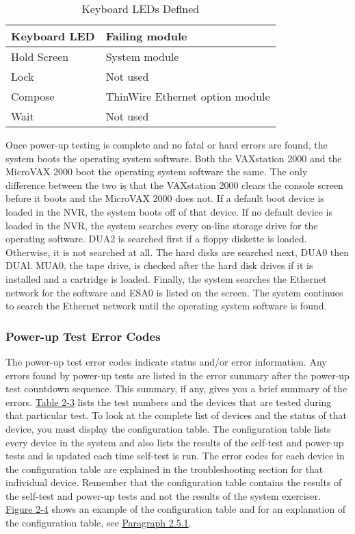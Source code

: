 \begin{table}
\label{table:2-2}
\caption{Keyboard LEDs Deflned}
\small
\begin{tabularx}{\textwidth}{l l}
\hline
\textbf{Keyboard LED} & \textbf{Failing module}\\
\hline
Hold Screen & System module \\
Lock & Not used \\
Compose & ThinWire Ethernet option module \\
Wait & Not used \\
\hline
\end{tabularx}
\end{table}

Once power-up testing is complete and no fatal or hard errors are found, the
system boots the operating system software. Both the VAXstation 2000 and
the MicroVAX 2000 boot the operating system software the same. The only
difference between the two is that the VAXstation 2000 clears the console
screen before it boots and the MicroVAX 2000 does not. If a default boot
device is loaded in the NVR, the system boots off of that device. If no
default device is loaded in the NVR, the system searches every on-line
storage drive for the operating software. DUA2 is searched first if a floppy
diskette is loaded. Otherwise, it is not searched at all. The hard disks are
searched next, DUA0 then DUAl. MUA0, the tape drive, is checked after
the hard disk drives if it is installed and a cartridge is loaded. Finally, the
system searches the Ethernet network for the software and ESA0 is listed
on the screen. The system continues to search the Ethernet network until
the operating system software is found.
\newpage
\subsubsection{Power-up Test Error Codes}

The power-up test error codes indicate status and/or error information. Any
errors found by power-up tests are listed in the error summary after the
power-up test countdown sequence. This summary, if any, gives you a brief
summary of the errors. \hyperref[table:2-3]{Table 2-3} lists the test numbers and the devices that
are tested during that particular test. To look at the complete list of devices
and the status of that device, you must display the configuration table. The
configuration table lists every device in the system and also lists the results
of the self-test and power-up tests and is updated each time self-test is run.
The error codes for each device in the configuration table are explained in
the troubleshooting section for that individual device. Remember that the
configuration table contains the results of the self-test and power-up tests
and not the results of the system exerciser. \hyperref[figure:2-4]{Figure 2-4} shows an example
of the configuration table and for an explanation of the configuration table,
see \hyperlink{subsection.2.5.1}{Paragraph 2.5.1}.


